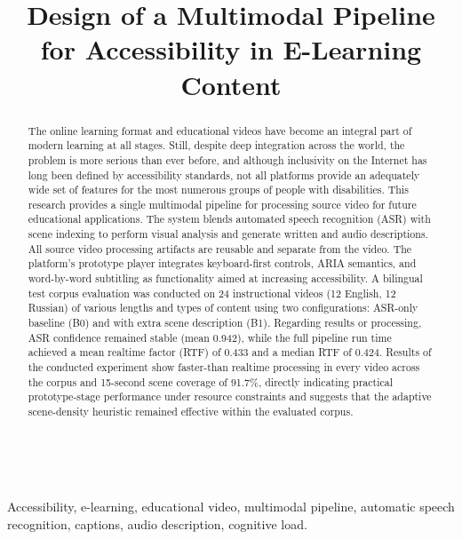 ﻿﻿\documentclass[conference]{IEEEtran}
\begin{document}
\title{Design of a Multimodal Pipeline for Accessibility in E-Learning Content}

\author{
}

\maketitle

\begin{abstract}
The online learning format and educational videos have become an integral part of modern learning at all stages. Still, despite deep integration across the world, the problem is more serious than ever before, and although inclusivity on the Internet has long been defined by accessibility standards, not all platforms provide an adequately wide set of features for the most numerous groups of people with disabilities. This research provides a single multimodal pipeline for processing source video for future educational applications. The system blends automated speech recognition (ASR) with scene indexing to perform visual analysis and generate written and audio descriptions. All source video processing artifacts are reusable and separate from the video. The platform's prototype player integrates keyboard-first controls, ARIA semantics, and word-by-word subtitling as functionality aimed at increasing accessibility. A bilingual test corpus evaluation was conducted on 24 instructional videos (12 English, 12 Russian) of various lengths and types of content using two configurations: ASR-only baseline (B0) and with extra scene description (B1). Regarding results or processing, ASR confidence remained stable (mean 0.942), while the full pipeline run time achieved a mean realtime factor (RTF) of 0.433 and a median RTF of 0.424. Results of the conducted experiment show faster-than realtime processing in every video across the corpus and 15-second scene coverage of 91.7\%, directly indicating practical prototype-stage performance under resource constraints and suggests that the adaptive scene-density heuristic remained effective within the evaluated corpus.

\end{abstract}

\begin{IEEEkeywords}
Accessibility, e-learning, educational video, multimodal pipeline, automatic speech recognition, captions, audio description, cognitive load.
\end{IEEEkeywords}
\end{document}
